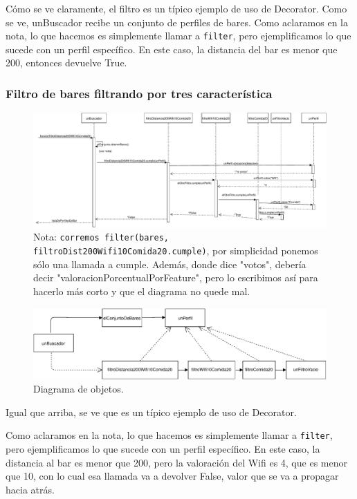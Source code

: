 Cómo se ve claramente, el filtro es un típico ejemplo de uso de Decorator. Como se ve, unBuscador recibe un conjunto de perfiles de bares. Como aclaramos en la nota, lo que hacemos es simplemente llamar a \texttt{filter}, pero ejemplificamos lo que sucede con un perfil específico. En este caso, la distancia del bar es menor que 200, entonces devuelve True.

\subsubsection{Filtro de bares filtrando por tres característica}

\begin{figure}[H]
  \centering
  \includegraphics[width=\textwidth]{diagramas/secuencia_3.pdf}
  \caption{\normalfont Nota: \texttt{corremos filter(bares, filtroDist200Wifi10Comida20.cumple)}, por simplicidad ponemos sólo una llamada a cumple.
Además, donde dice "votos", debería decir "valoracionPorcentualPorFeature", pero lo escribimos así para hacerlo más corto y que el diagrama no quede mal.
}
\end{figure}


\begin{figure}[H]
  \centering
  \includegraphics[width=\textwidth]{diagramas/objetos_3.pdf}
  \caption{\normalfont Diagrama de objetos.}
\end{figure}


Igual que arriba, se ve que es un típico ejemplo de uso de Decorator.

Como aclaramos en la nota, lo que hacemos es simplemente llamar a \texttt{filter}, pero ejemplificamos lo que sucede con un perfil específico. En este caso, la distancia al bar es menor que 200, pero la valoración del Wifi es 4, que es menor que 10, con lo cual esa llamada va a devolver False, valor que se va a propagar hacia atrás.

